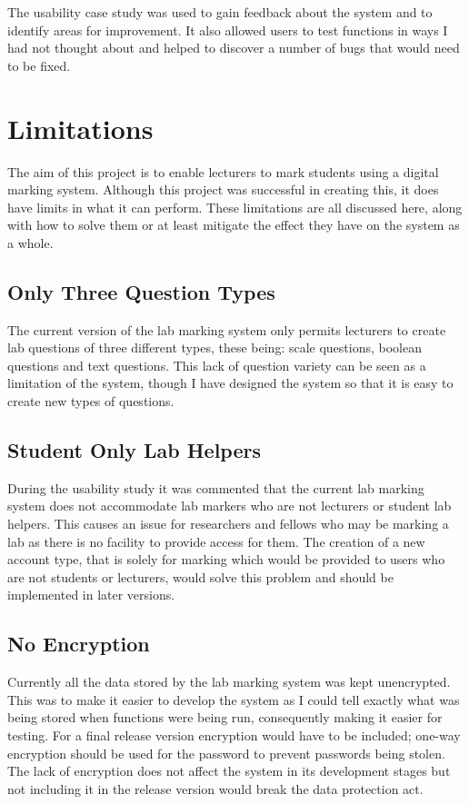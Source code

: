 \documentclass[11pt]{report}
\begin{document}
The usability case study was used to gain feedback about the system and to identify areas for improvement. It also allowed users to test functions in ways I had not thought about and helped to discover a number of bugs that would need to be fixed.






\section{Limitations}

The aim of this project is to enable lecturers to mark students using a digital marking system. Although this project was successful in creating this, it does have limits in what it can perform. These limitations are all discussed here, along with how to solve them or at least mitigate the effect they have on the system as a whole.

\subsection{Only Three Question Types}

The current version of the lab marking system only permits lecturers to create lab questions of three different types, these being: scale questions, boolean questions and text questions. This lack of question variety can be seen as a limitation of the system, though I have designed the system so that it is easy to create new types of questions.

\subsection{Student Only Lab Helpers}

During the usability study it was commented that the current lab marking system does not accommodate lab markers who are not lecturers or student lab helpers. This causes an issue for researchers and fellows who may be marking a lab as there is no facility to provide access for them. The creation of a new account type, that is solely for marking which would be provided to users who are not students or lecturers, would solve this problem and should be implemented in later versions.

\subsection{No Encryption}

Currently all the data stored by the lab marking system was kept unencrypted. This was to make it easier to develop the system as I could tell exactly what was being stored when functions were being run, consequently making it easier for testing. For a final release version encryption would have to be included; one-way encryption should be used for the password to prevent passwords being stolen. The lack of encryption does not affect the system in its development stages but not including it in the release version would break the data protection act. 
\end{document}

